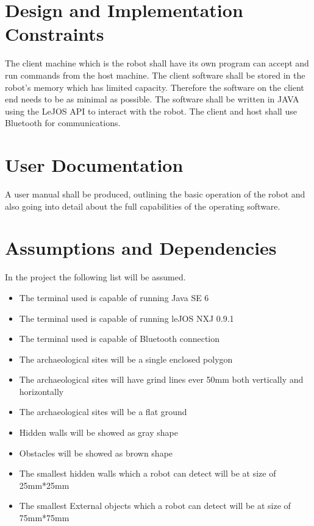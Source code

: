 \documentclass[11pt, a4paper]{report}
\begin{document}
\section{Design and Implementation Constraints}
The client machine which is the robot shall have its own program can accept and run commands from the host machine. The client software shall be stored in the robot's memory which has limited capacity. Therefore the software on the client end needs to be as minimal as possible.
The software shall be written in JAVA using the LeJOS API to interact with the robot.
The client and host shall use Bluetooth\textregistered{}  for communications.

\section{User Documentation}
A user manual shall be produced, outlining the basic operation of the robot and also going into detail about the full capabilities of the operating software.


\section{Assumptions and Dependencies}
In the project the following list will be assumed.

\begin{itemize}
  \item{The terminal used is capable of running Java SE 6}
  \item{The terminal used is capable of running leJOS NXJ 0.9.1}
  \item{The terminal used is capable of Bluetooth connection}
  \item{The archaeological sites will be a single enclosed polygon}
  \item{The archaeological sites will have grind lines ever 50mm both vertically and horizontally}
  \item{The archaeological sites will be a flat ground}
  \item{Hidden walls will be showed as gray shape}
  \item{Obstacles will be showed as brown shape}
  \item{The smallest hidden walls which a robot can detect will be at size of 25mm*25mm}
  \item{The smallest External objects which a robot can detect will be at size of 75mm*75mm}
\end{itemize}
\end{document}
